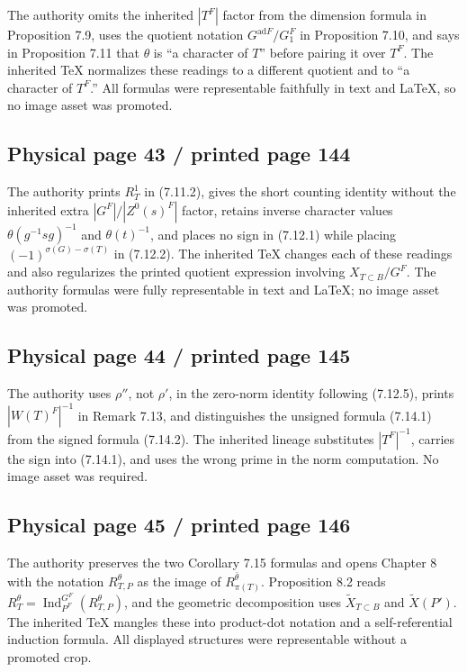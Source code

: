 \documentclass[10pt]{article}
\begin{document}
The authority omits the inherited \(|T^F|\) factor from the dimension formula in Proposition 7.9, uses the quotient notation \(G^{\mathrm{ad}F}/G_1^F\) in Proposition 7.10, and says in Proposition 7.11 that \(\theta\) is “a character of \(T\)” before pairing it over \(T^F\). The inherited TeX normalizes these readings to a different quotient and to “a character of \(T^F\).” All formulas were representable faithfully in text and LaTeX, so no image asset was promoted.\par

\subsection*{Physical page 43 / printed page 144}

The authority prints \(R_T^1\) in (7.11.2), gives the short counting identity without the inherited extra \(|G^F|/|Z^0(s)^F|\) factor, retains inverse character values \(\theta(g^{-1}sg)^{-1}\) and \(\theta(t)^{-1}\), and places no sign in (7.12.1) while placing \((-1)^{\sigma(G)-\sigma(T)}\) in (7.12.2). The inherited TeX changes each of these readings and also regularizes the printed quotient expression involving \(X_{T\subset B}/G^F\). The authority formulas were fully representable in text and LaTeX; no image asset was promoted.\par

\subsection*{Physical page 44 / printed page 145}

The authority uses \(\rho''\), not \(\rho'\), in the zero-norm identity following (7.12.5), prints \(|W(T)^F|^{-1}\) in Remark 7.13, and distinguishes the unsigned formula (7.14.1) from the signed formula (7.14.2). The inherited lineage substitutes \(|T^F|^{-1}\), carries the sign into (7.14.1), and uses the wrong prime in the norm computation. No image asset was required.\par

\subsection*{Physical page 45 / printed page 146}

The authority preserves the two Corollary 7.15 formulas and opens Chapter 8 with the notation \(R_{T,P}^\theta\) as the image of \(R_{\pi(T)}^{\bar\theta}\). Proposition 8.2 reads \(R_T^\theta=\operatorname{Ind}_{P^F}^{G^F}(R_{T,P}^\theta)\), and the geometric decomposition uses \(\widetilde X_{T\subset B}\) and \(\widetilde X(P')\). The inherited TeX mangles these into product-dot notation and a self-referential induction formula. All displayed structures were representable without a promoted crop.\par
\end{document}
